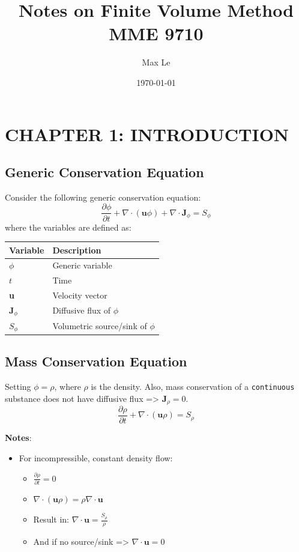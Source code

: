 \documentclass[14pt]{article}
\author{Max Le}
\date{\today}
\title{Notes on Finite Volume Method MME 9710}
\begin{document}
\maketitle
\tableofcontents \clearpage


\section{CHAPTER 1: INTRODUCTION}
\label{sec:org1c33135}
\subsection{Generic Conservation Equation}
\label{sec:org017933a}
Consider the following generic conservation equation:
\begin{equation}
\frac{\partial \phi}{\partial t} + \nabla \cdot (\textbf{u}\phi) + \nabla \cdot \textbf{J}_\phi = S_\phi
\end{equation}
where the variables are defined as:


\begin{center}
\begin{tabular}{ll}
\textbf{Variable} & \textbf{Description}\\
\hline
\(\phi\) & Generic variable\\
\(t\) & Time\\
\textbf{u} & Velocity vector\\
\(\textbf{J}_\phi\) & Diffusive flux of \(\phi\)\\
\(S_\phi\) & Volumetric source/sink of \(\phi\)\\
\hline
\end{tabular}
\end{center}

\subsection{Mass Conservation Equation}
\label{sec:orga6a3b15}
Setting \(\phi = \rho\), where \(\rho\) is the density. Also, mass conservation of a \texttt{continuous} substance does not
have diffusive flux => \(\textbf{J}_\rho = 0\).
\begin{equation}
\frac{\partial \rho}{\partial t} + \nabla \cdot (\textbf{u}\rho) = S_\rho
\end{equation}

\textbf{Notes}:
\begin{itemize}
\item For incompressible, constant density flow:
\begin{itemize}
\item \(\frac{\partial \rho}{\partial t} = 0\)
\item \(\nabla \cdot (\textbf{u}\rho) = \rho \nabla \cdot \textbf{u}\)
\item Result in: \(\nabla \cdot \textbf{u} = \frac{S_\rho}{\rho}\)
\item And if no source/sink => \(\nabla \cdot \textbf{u} = 0\)
\end{itemize}
\end{itemize}
\end{document}
